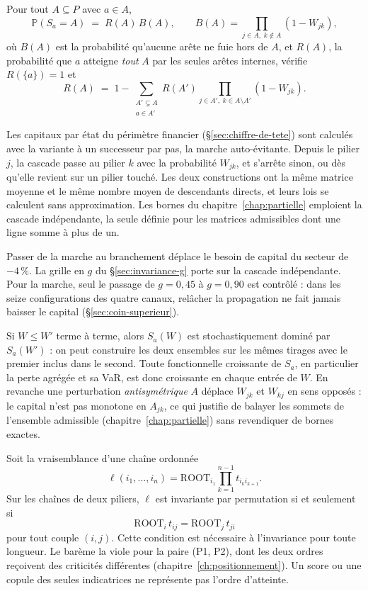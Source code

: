 \begin{proposition}
\label{prop:loi}
Pour tout $A\subseteq P$ avec $a\in A$,
\[
  \mathbb P(S_a=A)\;=\;R(A)\,B(A),\qquad
  B(A)=\!\!\prod_{j\in A,\;k\notin A}\!\!(1-W_{jk}),
\]
où $B(A)$ est la probabilité qu'aucune arête ne fuie hors de $A$, et $R(A)$, la probabilité
que $a$ atteigne \emph{tout} $A$ par les seules arêtes internes, vérifie $R(\{a\})=1$ et
\[
  R(A)\;=\;1-\sum_{\substack{A'\subsetneq A\\ a\in A'}} R(A')\!\!\prod_{j\in A',\;k\in A\setminus A'}\!\!(1-W_{jk}).
\]
\end{proposition}

\noindent Les capitaux par état du périmètre financier (\S\ref{sec:chiffre-de-tete}) sont calculés avec la variante à un successeur par pas, la marche
auto-évitante. Depuis le pilier $j$, la cascade passe au pilier $k$ avec la probabilité $W_{jk}$, et
s'arrête sinon, ou dès qu'elle revient sur un pilier touché. Les deux constructions ont la même
matrice moyenne et le même nombre moyen de descendants directs, et leurs lois se calculent
sans approximation. Les bornes du chapitre~\ref{chap:partielle} emploient la cascade indépendante, la
seule définie pour les matrices admissibles dont une ligne somme à plus de un.

Passer de la marche au branchement déplace le besoin de capital du secteur de $-4\,\%$. La grille
en $g$ du \S\ref{sec:invariance-g} porte sur la cascade indépendante. Pour la marche, seul le
passage de $g=0{,}45$ à $g=0{,}90$ est contrôlé : dans les seize configurations des quatre canaux,
relâcher la propagation ne fait jamais baisser le capital (\S\ref{sec:coin-superieur}).

\begin{proposition}
\label{prop:mono}
Si $W\le W'$ terme à terme, alors $S_a(W)$ est stochastiquement dominé par $S_a(W')$ : on peut construire les deux ensembles sur les mêmes tirages avec le premier inclus dans le second. Toute
fonctionnelle croissante de $S_a$, en particulier la perte agrégée et sa VaR, est donc
croissante en chaque entrée de $W$. En revanche une perturbation \emph{antisymétrique}
$A$ déplace $W_{jk}$ et $W_{kj}$ en sens opposés : le capital n'est pas monotone en $A_{jk}$,
ce qui justifie de balayer les sommets de l'ensemble admissible
(chapitre~\ref{chap:partielle}) sans revendiquer de bornes exactes.
\end{proposition}

\begin{proposition}
\label{prop:ordre}
Soit la vraisemblance d'une chaîne ordonnée
\[
\ell(i_1,\dots,i_n)=\mathrm{ROOT}_{i_1}\prod_{k=1}^{n-1}t_{i_k i_{k+1}}.
\]
Sur les chaînes de deux piliers, $\ell$ est invariante par
permutation si et seulement si
\[
\mathrm{ROOT}_i\,t_{ij}=\mathrm{ROOT}_j\,t_{ji}
\]
pour tout couple $(i,j)$. Cette condition est nécessaire à l'invariance pour toute longueur. Le barème la viole pour la paire (P1, P2), dont les deux ordres reçoivent des criticités différentes (chapitre~\ref{ch:positionnement}). Un score ou une copule des seules indicatrices ne représente pas l'ordre d'atteinte.
\end{proposition}

